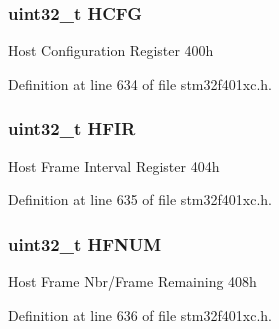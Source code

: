 \subsubsection[{\texorpdfstring{H\+C\+FG}{HCFG}}]{ uint32\+\_\+t H\+C\+FG}\hypertarget{struct_u_s_b___o_t_g___host_type_def_aa15bc4ab9217b295560dbda2235c745a}{}\label{struct_u_s_b___o_t_g___host_type_def_aa15bc4ab9217b295560dbda2235c745a}
Host Configuration Register 400h 

Definition at line 634 of file stm32f401xc.\+h.

\subsubsection[{\texorpdfstring{H\+F\+IR}{HFIR}}]{ uint32\+\_\+t H\+F\+IR}\hypertarget{struct_u_s_b___o_t_g___host_type_def_a0a6f11662e44ad485cc869f49e5aa9c9}{}\label{struct_u_s_b___o_t_g___host_type_def_a0a6f11662e44ad485cc869f49e5aa9c9}
Host Frame Interval Register 404h 

Definition at line 635 of file stm32f401xc.\+h.

\subsubsection[{\texorpdfstring{H\+F\+N\+UM}{HFNUM}}]{ uint32\+\_\+t H\+F\+N\+UM}\hypertarget{struct_u_s_b___o_t_g___host_type_def_a6a141fc0dab9ee8930465a2da604420f}{}\label{struct_u_s_b___o_t_g___host_type_def_a6a141fc0dab9ee8930465a2da604420f}
Host Frame Nbr/\+Frame Remaining 408h 

Definition at line 636 of file stm32f401xc.\+h.

